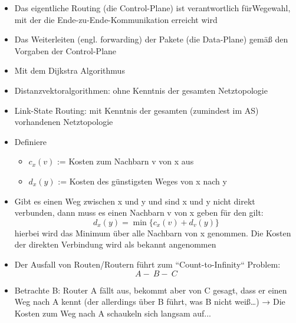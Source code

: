
\begin{itemize}
    \item Das eigentliche Routing (die Control-Plane) ist verantwortlich fürWegewahl, mit der die Ende-zu-Ende-Kommunikation erreicht wird
    \item Das Weiterleiten (engl. forwarding) der Pakete (die Data-Plane) gemäß den Vorgaben der Control-Plane
\end{itemize}

\begin{itemize}
    \item Mit dem Dijkstra Algorithmus
\end{itemize}

\begin{itemize}
    \item Distanzvektoralgorithmen: ohne Kenntnis der gesamten Netztopologie
    \item Link-State Routing: mit Kenntnis der gesamten (zumindest im AS) vorhandenen Netztopologie
\end{itemize}

\begin{itemize}
    \item Definiere
    \begin{itemize}
        \item \(c_x(v)\) := Kosten zum Nachbarn v von x aus
        \item \(d_x(y)\) := Kosten des günstigsten Weges von x nach y
    \end{itemize}
    \item Gibt es einen Weg zwischen x und y und sind x und y nicht direkt verbunden, dann muss es einen Nachbarn v von x geben für den gilt:
    \[d_x(y) = \min \{c_x(v) + d_v(y) \}\]
    hierbei wird das Minimum über alle Nachbarn von x genommen.
    Die Kosten der direkten Verbindung wird als bekannt angenommen
\end{itemize}

\begin{itemize}
    \item Der Ausfall von Routen/Routern führt zum ``Count-to-Infinity`` Problem: \[A -\: B -\: C\]
    \item Betrachte B: Router A fällt aus, bekommt aber von C gesagt, dass er einen Weg nach A kennt (der allerdings über B führt, was B nicht weiß…) → Die Kosten zum Weg nach A schaukeln sich langsam auf...
\end{itemize}

